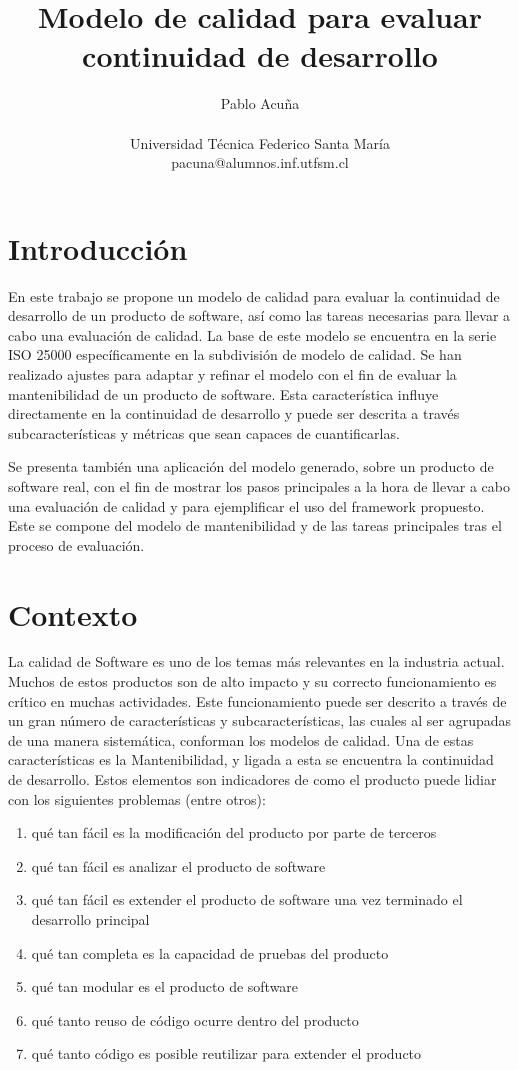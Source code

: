 \documentclass[letterpaper]{article}
\title{Modelo de calidad para evaluar continuidad de desarrollo}
\author{Pablo Acuña\\
\mbox{}\\
Universidad Técnica Federico Santa María \\
pacuna@alumnos.inf.utfsm.cl}
\begin{document}
\maketitle

\section{Introducción}

En este trabajo se propone un modelo de calidad para evaluar la continuidad
de desarrollo de un producto de software, así como las tareas necesarias
para llevar a cabo una evaluación de calidad.
La base de este modelo se encuentra en la serie ISO 25000
específicamente en la subdivisión de modelo de calidad.
Se han realizado ajustes para adaptar y refinar el modelo con el fin de evaluar la mantenibilidad de un producto de software.
Esta característica influye directamente en la continuidad de desarrollo y puede
ser descrita a través subcaracterísticas y métricas que sean capaces de cuantificarlas.

Se presenta también una aplicación del modelo generado, sobre un producto de software
real, con el fin de mostrar los pasos principales a la hora de llevar a cabo
una evaluación de calidad y para ejemplificar el uso del framework propuesto. Este se compone
del modelo de mantenibilidad y de las tareas principales tras el proceso de evaluación.

\section{Contexto}
La calidad de Software es uno de los temas más relevantes en la industria actual. Muchos de estos productos
son de alto impacto y su correcto funcionamiento es crítico en muchas actividades. Este funcionamiento
puede ser descrito a través de un gran número de características y subcaracterísticas, las cuales al ser agrupadas
de una manera sistemática, conforman los modelos de calidad. Una de estas características es la Mantenibilidad, y ligada
a esta se encuentra la continuidad de desarrollo. Estos elementos son indicadores de como el producto puede lidiar
con los siguientes problemas (entre otros):
\begin{enumerate}
	\item qué tan fácil es la modificación del producto por parte de terceros
	\item qué tan fácil es analizar el producto de software
	\item qué tan fácil es extender el producto de software una vez terminado el desarrollo principal
	\item qué tan completa es la capacidad de pruebas del producto
	\item qué tan modular es el producto de software
	\item qué tanto reuso de código ocurre dentro del producto
    \item qué tanto código es posible reutilizar para extender el producto
\end{enumerate}
\end{document}
